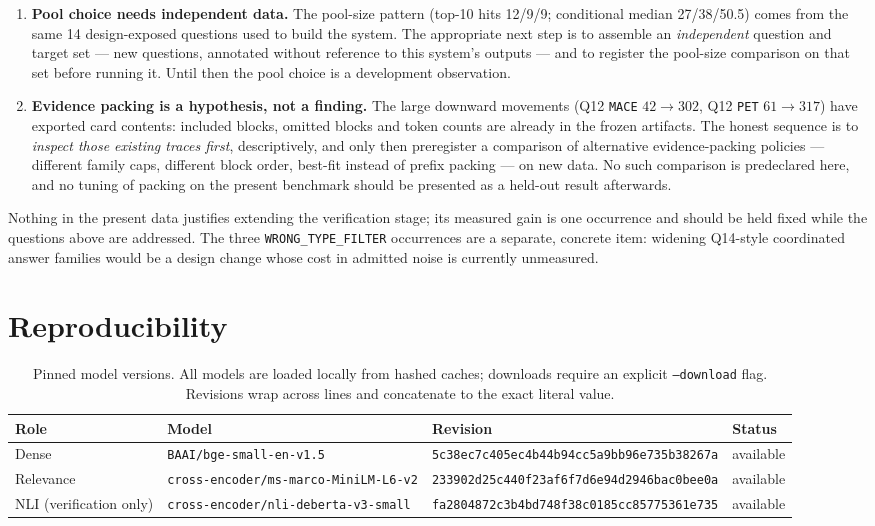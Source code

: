 \documentclass[11pt,a4paper]{article}
\newcommand{\hx}[2]{\texttt{#1}\allowbreak\texttt{#2}}
\begin{document}
\begin{enumerate}
\item \textbf{Pool choice needs independent data.} The pool-size pattern (top-10 hits 12/9/9; conditional
median 27/38/50.5) comes from the same 14 design-exposed questions used to build the system. The appropriate
next step is to assemble an \emph{independent} question and target set --- new questions, annotated without
reference to this system's outputs --- and to register the pool-size comparison on that set before running
it. Until then the pool choice is a development observation.
\item \textbf{Evidence packing is a hypothesis, not a finding.} The large downward movements (Q12
\texttt{MACE} $42 \to 302$, Q12 \texttt{PET} $61 \to 317$) have exported card contents: included blocks,
omitted blocks and token counts are already in the frozen artifacts. The honest sequence is to
\emph{inspect those existing traces first}, descriptively, and only then preregister a comparison of
alternative evidence-packing policies --- different family caps, different block order, best-fit instead of
prefix packing --- on new data. No such comparison is predeclared here, and no tuning of packing on the
present benchmark should be presented as a held-out result afterwards.
\end{enumerate}

Nothing in the present data justifies extending the verification stage; its measured gain is one occurrence
and should be held fixed while the questions above are addressed. The three \texttt{WRONG\_TYPE\_FILTER}
occurrences are a separate, concrete item: widening Q14-style coordinated answer families would be a design
change whose cost in admitted noise is currently unmeasured.

\section{Reproducibility}

\begin{table}[htbp]
\centering
\small
\caption{Pinned model versions. All models are loaded locally from hashed caches; downloads require an
explicit \texttt{--download} flag. Revisions wrap across lines and concatenate to the exact literal value.}
\label{tab:models}
\begin{tabular}{p{2.3cm}p{4.1cm}p{5.2cm}l}
\toprule
Role & Model & Revision & Status \\
\midrule
Dense & \texttt{BAAI/bge-small-en-v1.5} & \hx{5c38ec7c405ec4b44b94}{cc5a9bb96e735b38267a} & available \\
Relevance & \texttt{cross-encoder/\allowbreak ms-marco-MiniLM-L6-v2} & \hx{233902d25c440f23af6f}{7d6e94d2946bac0bee0a} & available \\
NLI (verification only) & \texttt{cross-encoder/\allowbreak nli-deberta-v3-small} & \hx{fa2804872c3b4bd748f3}{8c0185cc85775361e735} & available \\
\bottomrule
\end{tabular}
\end{table}
\end{document}
